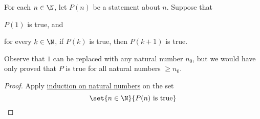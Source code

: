 \label{b51ca45}

For each $n\in\N$, let $P(n)$ be a statement about $n$. Suppose that
\begin{enumerati}
  \item $P(1)$ is true, and
  \item for every $k\in\N$, if $P(k)$ is true, then $P(k+1)$ is true.
\end{enumerati}

Observe that $1$ can be replaced with any natural number $n_0$, but we would
have only proved that $P$ is true for all natural numbers $\geq n_0$.

\begin{proof}
  Apply \href{a824f8c}{induction on natural numbers} on the set
  $$
    \set{n\in\N}{P(n)\text{ is true}}
  $$
\end{proof}
